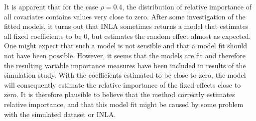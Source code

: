 It is apparent that for the case $\rho=0.4$, the distribution of relative importance of all covariates contains values very close to zero. After some investigation of the fitted models, it turns out that INLA sometimes returns a model that estimates all fixed coefficients to be $0$, but estimates the random effect almost as expected. One might expect that such a model is not sensible and that a model fit should not have been possible. However, it seems that the models are fit and therefore the resulting variable importance measures have been included in results of the simulation study. With the coefficients estimated to be close to zero, the model will consequently estimate the relative importance of the fixed effects close to zero. It is therefore plausible to believe that the method correctly estimates relative importance, and that this model fit might be caused by some problem with the simulated dataset or INLA.

